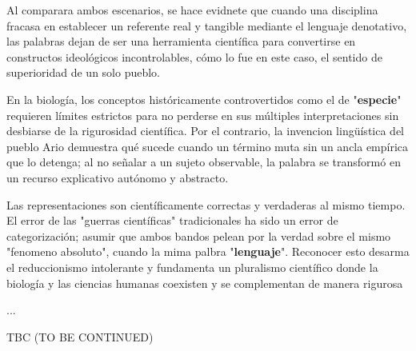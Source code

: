 \documentclass[12pt]{article}
\begin{document}
Al comparara ambos escenarios, se hace evidnete que cuando una disciplina fracasa en establecer un referente real y tangible mediante el lenguaje denotativo, las palabras dejan de ser una herramienta científica para convertirse en constructos ideológicos incontrolables, cómo lo fue en este caso, el sentido de superioridad de un solo pueblo.

En la biología, los conceptos históricamente controvertidos como el de "\textbf{especie}" requieren límites estrictos para no perderse en sus múltiples interpretaciones sin desbiarse de la rigurosidad científica. Por el contrario, la invencion lingüística del pueblo Ario demuestra qué sucede cuando un término muta sin un ancla empírica que lo detenga; al no señalar a un sujeto observable, la palabra se transformó en un recurso explicativo autónomo y abstracto.

Las representaciones son científicamente correctas y verdaderas al mismo tiempo. El error de las "guerras científicas" tradicionales ha sido un error de categorización; asumir que ambos bandos pelean por la verdad sobre el mismo "fenomeno absoluto", cuando la mima palbra "\textbf{lenguaje}". Reconocer esto desarma el reduccionismo intolerante y fundamenta un pluralismo científico donde la biología y las ciencias humanas coexisten y se complementan de manera rigurosa

... 

TBC (TO BE CONTINUED) 
\end{document}
